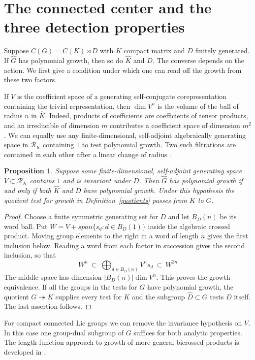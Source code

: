 \documentclass[11pt,a4paper]{article}
\newtheorem{prop}[thm]{Proposition}
\theoremstyle{remark}
\begin{document}
\section{The connected center and the three detection properties}\label{secjoint}

Suppose $C(G)=C(K)\rtimes D$ with $K$ compact matrix and $D$
finitely generated.
If $\widehat G$ has polynomial growth, then so do $\widehat K$ and $D$.
The converse depends on the action. We first give a condition under which
one can read off the growth from these two factors.

If $V$ is the coefficient space of a generating
self-conjugate corepresentation containing the trivial representation,
then $\dim V^n$ is the volume of the ball of radius $n$ in $\widehat K$.
Indeed, products of coefficients are coefficients of tensor products, and
an irreducible of dimension $m$ contributes a coefficient space of
dimension $m^2$. We can equally use any finite-dimensional, self-adjoint
algebraically generating space in $\mathcal R_K$ containing $1$ to test polynomial growth. Two such
filtrations are contained in each other after a linear change of radius
\cite{dpr}.

\begin{prop}\label{length}
Suppose some finite-dimensional, self-adjoint generating space
$V\subset\mathcal R_K$ contains $1$ and is invariant under $D$.
Then $\widehat G$ has polynomial growth if and only if both $\widehat K$
and $D$ have polynomial growth. Under this hypothesis the quotient test
for growth in Definition~\ref{quotients} passes from $K$ to $G$.
\end{prop}
\begin{proof}
Choose a finite symmetric generating set for $D$ and let $B_D(n)$ be its
word ball. Put $W=V+span\{s_d:d\in B_D(1)\}$ inside the
algebraic crossed product. Moving group elements to the right in a word
of length $n$ gives the first inclusion below. Reading a word from each
factor in succession gives the second inclusion, so that
\[
 W^n\ \subset\ \bigoplus_{d\in B_D(n)} V^n s_d
       \ \subset\ W^{2n}
\]
The middle space has dimension $|B_D(n)|\dim V^n$. This proves the
growth equivalence. If all the groups in the tests for $G$ have polynomial
growth, the quotient $G\twoheadrightarrow K$ supplies every test for
$K$ and the subgroup $\widehat D\subset G$ tests $D$ itself. The last
assertion follows.
\end{proof}

For compact connected Lie groups we can remove the invariance hypothesis
on $V$. In this case one group-dual subgroup of $G$ suffices for both
analytic properties. The length-function approach to growth of more
general bicrossed products is developed in \cite{fw}.
\end{document}
